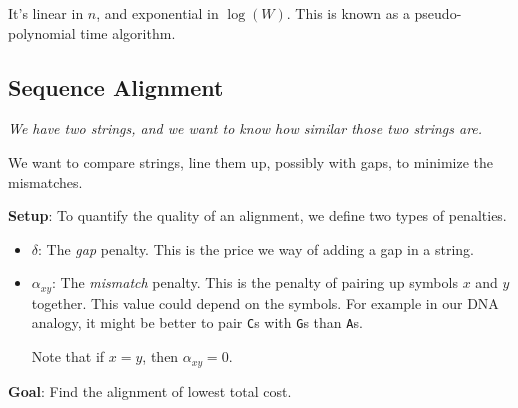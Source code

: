 \documentclass[12pt]{article}
\begin{document}
  It's linear in $n$, and exponential in $\log(W)$. This is known as a
  pseudo-polynomial time algorithm.







  \subsection{Sequence Alignment}

  {\it We have two strings, and we want to know how similar those two strings are.}

  We want to compare strings, line them up, possibly with gaps, to minimize the
  mismatches.


  {\bf Setup}: To quantify the quality of an alignment, we define two types of
  penalties.

  \begin{itemize}
    \item $\delta$: The {\it gap} penalty. This is the price we way of adding a gap in
      a string.
    \item $\alpha_{xy}$: The {\it mismatch} penalty. This is the penalty of
      pairing up symbols $x$ and $y$ together. This value could depend on the
      symbols. For example in our DNA analogy, it might be better to pair
      \texttt{C}s with \texttt{G}s than \texttt{A}s.

      Note that if $x = y$, then $\alpha_{xy} = 0$.
  \end{itemize}

  {\bf Goal}: Find the alignment of lowest total cost.

\end{document}
